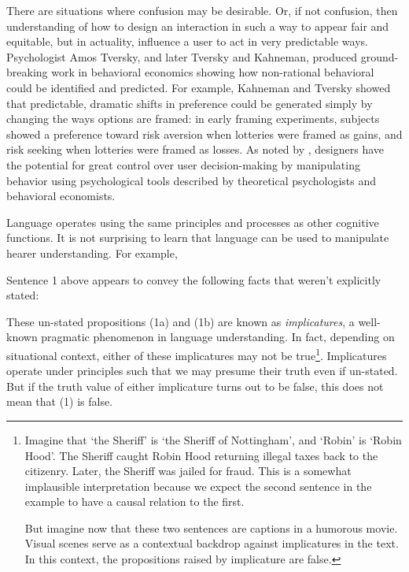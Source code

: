 There are situations where confusion may be desirable. Or, if not confusion, then understanding of how to design an interaction in such a way to appear fair and equitable, but in actuality, influence a user to act in very predictable ways. Psychologist Amos Tversky, and later Tversky and Kahneman, produced ground-breaking work in behavioral economics showing how non-rational behavioral could be identified and predicted. For example, Kahneman and Tversky  \citeyearpar{Tversky:1981vc}  showed that predictable, dramatic shifts in preference could be generated simply by changing the ways options are framed: in early framing experiments, subjects showed a preference toward risk aversion when lotteries were framed as gains, and risk seeking when lotteries were framed as losses. As noted by  \citet*{Thaler:2010uy} , designers have the potential for great control over user decision-making by manipulating behavior using psychological tools described by theoretical psychologists and behavioral economists.

Language operates using the same principles and processes as other cognitive functions. It is not surprising to learn that language can be used to manipulate hearer understanding. For example,
 

Sentence 1 above appears to convey the following facts that weren't explicitly stated:


These un-stated propositions (1a) and (1b) are known as \emph{implicatures}, a well-known pragmatic phenomenon in language understanding. In fact, depending on situational context, either of these implicatures may not be true\footnote{Imagine that `the Sheriff' is `the Sheriff of Nottingham', and `Robin' is `Robin Hood'. The Sheriff caught Robin Hood returning illegal taxes back to the citizenry. Later, the Sheriff was jailed for fraud. This is a somewhat implausible interpretation because we expect the second sentence in the example to have a causal relation to the first. 

But imagine now that these two sentences are captions in a humorous movie. Visual scenes serve as a contextual backdrop against implicatures in the text. In this context, the propositions raised by implicature are false.}. Implicatures operate under principles such that we may presume their truth even if un-stated. But if the truth value of either implicature turns out to be false, this does not mean that (1) is false.

